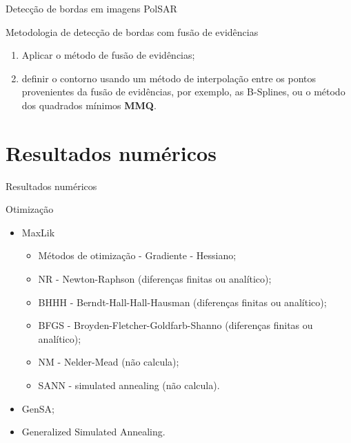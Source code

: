 \documentclass[10pt]{beamer}
\begin{document}
\begin{frame}{Detecção de bordas em imagens PolSAR}
\begin{alertblock}{Metodologia de detecção de bordas com fusão de evidências}
\begin{enumerate}
    \item Aplicar o método de fusão de evidências;
	\item definir o contorno usando um método de interpolação entre os pontos provenientes da fusão de evidências, por exemplo, as B-Splines, ou o método dos quadrados mínimos \textbf{MMQ}.
\end{enumerate}
\end{alertblock}
\end{frame}


\section{Resultados numéricos}
\begin{frame}{Resultados numéricos}
\begin{alertblock}{Otimização}
  \begin{itemize}
\item MaxLik
  	\begin{itemize}
	\item Métodos de otimização - Gradiente - Hessiano;
	\item NR   - Newton-Raphson (diferenças finitas ou analítico); 
	\item BHHH - Berndt-Hall-Hall-Hausman (diferenças finitas ou analítico);
	\item BFGS - Broyden-Fletcher-Goldfarb-Shanno (diferenças finitas ou analítico);
	\item NM   - Nelder-Mead  (não calcula);
        \item SANN - simulated annealing (não calcula).
	\end{itemize}
\item GenSA;
\item Generalized Simulated Annealing.
\end{itemize}
\end{alertblock}
\end{frame}
\end{document}
